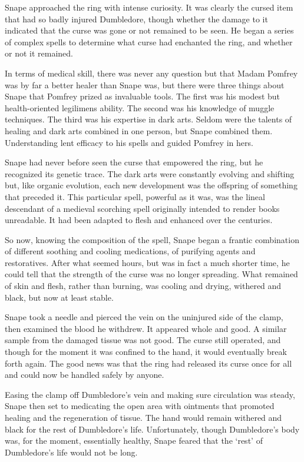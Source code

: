 Snape approached the ring with intense curiosity. It was clearly the cursed item that had so badly injured Dumbledore, though whether the damage to it indicated that the curse was gone or not remained to be seen. He began a series of complex spells to determine what curse had enchanted the ring, and whether or not it remained.

In terms of medical skill, there was never any question but that Madam Pomfrey was by far a better healer than Snape was, but there were three things about Snape that Pomfrey prized as invaluable tools. The first was his modest but health-oriented legilimens ability. The second was his knowledge of muggle techniques. The third was his expertise in dark arts. Seldom were the talents of healing and dark arts combined in one person, but Snape combined them. Understanding lent efficacy to his spells and guided Pomfrey in hers.

Snape had never before seen the curse that empowered the ring, but he recognized its genetic trace. The dark arts were constantly evolving and shifting but, like organic evolution, each new development was the offspring of something that preceded it. This particular spell, powerful as it was, was the lineal descendant of a medieval scorching spell originally intended to render books unreadable. It had been adapted to flesh and enhanced over the centuries.

So now, knowing the composition of the spell, Snape began a frantic combination of different soothing and cooling medications, of purifying agents and restoratives. After what seemed hours, but was in fact a much shorter time, he could tell that the strength of the curse was no longer spreading. What remained of skin and flesh, rather than burning, was cooling and drying, withered and black, but now at least stable.

Snape took a needle and pierced the vein on the uninjured side of the clamp, then examined the blood he withdrew. It appeared whole and good. A similar sample from the damaged tissue was not good. The curse still operated, and though for the moment it was confined to the hand, it would eventually break forth again. The good news was that the ring had released its curse once for all and could now be handled safely by anyone.

Easing the clamp off Dumbledore's vein and making sure circulation was steady, Snape then set to medicating the open area with ointments that promoted healing and the regeneration of tissue. The hand would remain withered and black for the rest of Dumbledore's life. Unfortunately, though Dumbledore's body was, for the moment, essentially healthy, Snape feared that the `rest' of Dumbledore's life would not be long.


